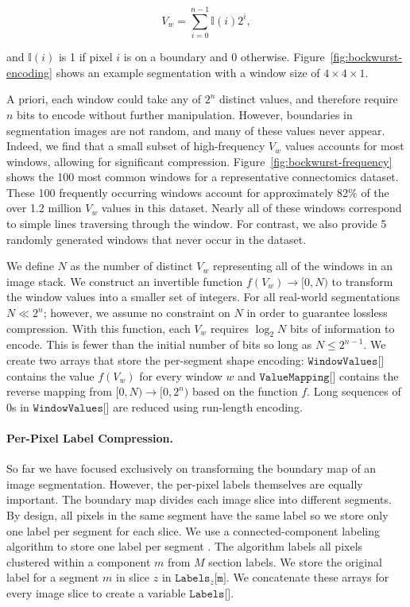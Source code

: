 \begin{equation}
V_w = \sum_{i = 0}^{n - 1} \mathbb{I}(i) 2^i,
\end{equation}

\noindent
and $\mathbb{I}(i)$ is 1 if pixel $i$ is on a boundary and 0 otherwise. 
Figure~\ref{fig:bockwurst-encoding} shows an example segmentation with a window size of $4 \times 4 \times 1$.


A priori, each window could take any of $2^n$ distinct values, and therefore require $n$ bits to encode without further manipulation. 
However, boundaries in segmentation images are not random, and many of these values never appear. 
Indeed, we find that a small subset of high-frequency $V_w$ values accounts for most windows, allowing for significant compression. 
Figure~\ref{fig:bockwurst-frequency} shows the 100 most common windows for a representative connectomics dataset. 
These 100 frequently occurring windows account for approximately 82\% of the over 1.2 million $V_w$ values in this dataset.
Nearly all of these windows correspond to simple lines traversing through the window. 
For contrast, we also provide 5 randomly generated windows that never occur in the dataset.

We define $N$ as the number of distinct $V_w$ representing all of the windows in an image stack. 
We construct an invertible function $f(V_w) \to [0, N)$ to transform the window values into a smaller set of integers. 
For all real-world segmentations $N \ll 2^n$; however, we assume no constraint on $N$ in order to guarantee lossless compression. 
With this function, each $V_w$ requires $\log_2{N}$ bits of information to encode. 
This is fewer than the initial number of bits so long as $N \leq 2^{n - 1}$.  
We create two arrays that store the per-segment shape encoding: $\texttt{WindowValues[]}$ contains the value $f(V_w)$ for every window $w$ and $\texttt{ValueMapping[]}$ contains the reverse mapping from $[0, N) \to [0, 2^n)$ based on the function $f$. 
Long sequences of $0$s in $\texttt{WindowValues[]}$ are reduced using run-length encoding.

\paragraph{Per-Pixel Label Compression.}

So far we have focused exclusively on transforming the boundary map of an image segmentation. 
However, the per-pixel labels themselves are equally important. 
The boundary map divides each image slice into different segments. 
By design, all pixels in the same segment have the same label so we store only one label per segment for each slice. 
We use a connected-component labeling algorithm to store one label per segment \cite{he2009fast}. 
The algorithm labels all pixels clustered within a component $m$ from $M$ section labels.
We store the original label for a segment $m$ in slice $z$ in $\texttt{Labels}_z\texttt{[m]}$. 
We concatenate these arrays for every image slice to create a variable $\texttt{Labels[]}$.

